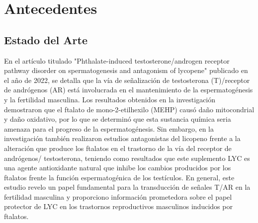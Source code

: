 \chapter{Antecedentes}
\renewcommand{\figurename}{Figura}

\section{Estado del Arte}
En el artículo titulado "Phthalate-induced testosterone/androgen receptor pathway disorder on spermatogenesis and antagonism of lycopene" publicado en el año de 2022, se detalla que la vía de señalización de testosterona (T)/receptor de andrógenos (AR) está involucrada en el mantenimiento de la espermatogénesis y la fertilidad masculina. Los resultados obtenidos en la investigación demostraron que el ftalato de mono-2-etilhexilo (MEHP) causó daño mitocondrial y daño oxidativo, por lo que se determinó que esta sustancia química seria amenaza para el progreso de la espermatogénesis. Sin embargo, en la investigación también realizaron estudios antagonistas del licopeno frente a la alteración que produce los ftalatos en el trastorno de la vía del receptor de andrógenos/ testosterona, teniendo como resultados que este suplemento LYC es una agente antioxidante natural que inhibe los cambios producidos por los ftalatos frente la función espermatogénica de los testículos. En general, este estudio revelo un papel fundamental para la transducción de señales T/AR en la fertilidad masculina y proporciono información prometedora sobre el papel protector de LYC en los trastornos reproductivos masculinos inducidos por ftalatos.\cite{b12}


